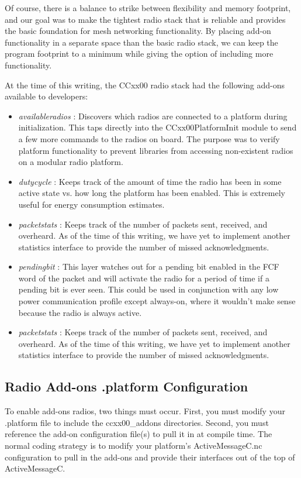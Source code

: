 \documentclass{article}
\begin{document}
Of course, there is a balance to strike between flexibility and memory footprint, and our goal was to make the tightest radio stack that is 
reliable and provides the basic foundation for mesh networking functionality. By placing add-on functionality in a separate space than the basic radio stack, we can keep the program footprint to a minimum while giving the option of including
more functionality.

At the time of this writing, the CCxx00 radio stack had the following add-ons available to developers:

\begin{itemize}
	\item \emph{availableradios} : Discovers which radios are connected to 
	a platform during initialization. This taps directly into the 
	CCxx00PlatformInit module to send a few more commands to the radios on 
	board. The purpose was to verify platform functionality to prevent 
	libraries from accessing non-existent radios on a modular radio
	platform.
	
	\item \emph{dutycycle} : Keeps track of the amount of time the radio has been in some active state vs. how long the platform has been enabled. This is extremely useful for energy consumption estimates.
	\item \emph{packetstats} : Keeps track of the number of packets sent, received, and overheard. As of the time of this writing, we have yet to implement another statistics interface to provide the number of missed acknowledgments.
	\item \emph{pendingbit} : This layer watches out for a pending bit enabled in the FCF word of the packet and will activate the radio for a period of time if a pending bit is ever seen. This could be used in conjunction with any low power communication profile except always-on, where it wouldn't make sense because the radio is always active.	
	\item \emph{packetstats} : Keeps track of the number of packets sent, received, and overheard. As of the time of this writing, we have yet to implement another statistics interface to provide the number of missed acknowledgments.
\end{itemize}


\subsection{Radio Add-ons .platform Configuration}
To enable add-ons radios, two things must occur. First, you must modify your .platform file to include the ccxx00\_addons directories. Second, you must reference the add-on configuration file(s) to pull it in at compile time. The normal coding
strategy is to modify your platform's ActiveMessageC.nc configuration to pull in the add-ons and provide their interfaces
out of the top of ActiveMessageC.
\end{document}
